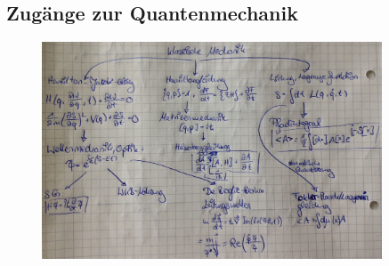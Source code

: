 \subsection{Zugänge zur Quantenmechanik}
\FloatBarrier
	\begin{figure} [h]
		\begin{center}
			\includegraphics[width = 0.9\textwidth]{Zugaenge_zur_Quantenmechanik1}
		\end{center}
	\end{figure} 